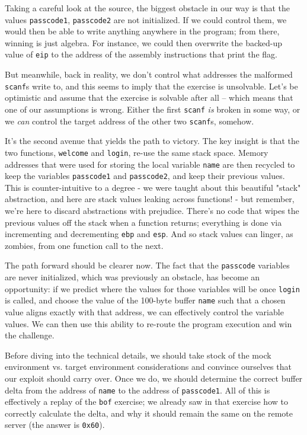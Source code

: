 \documentclass{article}
\newcommand{\xcode}[2]{\colorbox{ubuntuback}{\lstinline[language=#1]|#2|}}
\newcommand{\asm}[1]{\xcode{{[x86masm]assembler}}{#1}}
\newcommand{\code}[1]{\colorbox{ubuntuback}{\texttt{#1}}}
\begin{document}
Taking a careful look at the source, the biggest obstacle in our way is that the values \xcode{C}{passcode1}, \xcode{C}{passcode2} are not initialized. If we could control them, we would then be able to write anything anywhere in the program; from there, winning is just algebra. For instance, we could then overwrite the backed-up value of \asm{eip} to the address of the assembly instructions that print the flag. 

But meanwhile, back in reality, we don't control what addresses the malformed \code{scanf}s write to, and this seems to imply that the exercise is unsolvable. Let's be optimistic and assume that the exercise is solvable after all -- which means that one of our assumptions is wrong. Either the first \xcode{C}{scanf} \textit{is} broken in some way, or we \textit{can} control the target address of the other two \xcode{C}{scanf}s, somehow.

It's the second avenue that yields the path to victory. The key insight is that the two functions, \xcode{C}{welcome} and \xcode{C}{login}, re-use the same stack space. Memory addresses that were used for storing the local variable \xcode{C}{name} are then recycled to keep the variables \xcode{C}{passcode1} and \xcode{C}{passcode2}, and keep their previous values. This is counter-intuitive to a degree - we were taught about this beautiful "stack" abstraction, and here are stack values leaking across functions! - but remember, we're here to discard abstractions with prejudice. There's no code that wipes the previous values off the stack when a function returns; everything is done via incrementing and decrementing \asm{ebp} and \asm{esp}. And so stack values can linger, as zombies, from one function call to the next.

The path forward should be clearer now. The fact that the \xcode{C}{passcode} variables are never initialized, which was previously an obstacle, has become an opportunity: if we predict where the values for those variables will be once \xcode{C}{login} is called, and choose the value of the 100-byte buffer \xcode{C}{name} such that a chosen value aligns exactly with that address, we can effectively control the variable values. We can then use this ability to re-route the program execution and win the challenge.

Before diving into the technical details, we should take stock of the mock environment vs. target environment considerations and convince ourselves that our exploit should carry over. Once we do, we should determine the correct buffer delta from the address of \xcode{C}{name} to the address of \xcode{C}{passcode1}. All of this is effectively a replay of the \code{bof} exercise; we already saw in that exercise how to correctly calculate the delta, and why it should remain the same on the remote server (the answer is \code{0x60}).
\end{document}
